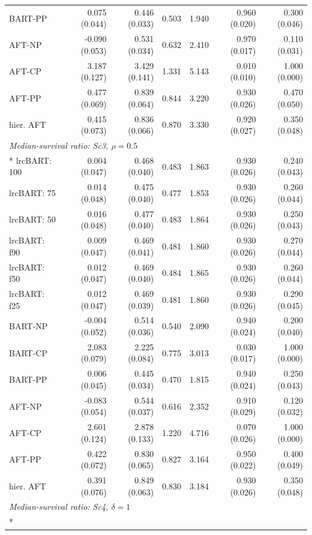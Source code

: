 \begin{landscape}
\begin{longtable}{lrrrrrr}
BART-PP & 0.075 (0.044) & 0.446 (0.033) & 0.503 & 1.940 & 0.960 (0.020) & 0.300 (0.046) \\
AFT-NP & -0.090 (0.053) & 0.531 (0.034) & 0.632 & 2.410 & 0.970 (0.017) & 0.110 (0.031) \\
AFT-CP & 3.187 (0.127) & 3.429 (0.141) & 1.331 & 5.143 & 0.010 (0.010) & 1.000 (0.000) \\
AFT-PP & 0.477 (0.069) & 0.839 (0.064) & 0.844 & 3.220 & 0.930 (0.026) & 0.470 (0.050) \\
hier. AFT & 0.415 (0.073) & 0.836 (0.066) & 0.870 & 3.330 & 0.920 (0.027) & 0.350 (0.048) \\
\multicolumn{7}{l}{\strut\textit{Median-survival ratio: Sc3, $\rho=0.5$}}\\*
lrcBART: 100 & 0.004 (0.047) & 0.468 (0.040) & 0.483 & 1.863 & 0.930 (0.026) & 0.240 (0.043) \\
lrcBART: 75 & 0.014 (0.048) & 0.475 (0.040) & 0.477 & 1.853 & 0.930 (0.026) & 0.260 (0.044) \\
lrcBART: 50 & 0.016 (0.048) & 0.477 (0.040) & 0.483 & 1.864 & 0.930 (0.026) & 0.250 (0.043) \\
lrcBART: f90 & 0.009 (0.047) & 0.469 (0.041) & 0.481 & 1.860 & 0.930 (0.026) & 0.270 (0.044) \\
lrcBART: f50 & 0.012 (0.047) & 0.469 (0.040) & 0.484 & 1.865 & 0.930 (0.026) & 0.260 (0.044) \\
lrcBART: f25 & 0.012 (0.047) & 0.469 (0.039) & 0.481 & 1.860 & 0.930 (0.026) & 0.290 (0.045) \\
BART-NP & -0.004 (0.052) & 0.514 (0.036) & 0.540 & 2.090 & 0.940 (0.024) & 0.200 (0.040) \\
BART-CP & 2.083 (0.079) & 2.225 (0.084) & 0.775 & 3.013 & 0.030 (0.017) & 1.000 (0.000) \\
BART-PP & 0.006 (0.045) & 0.445 (0.034) & 0.470 & 1.815 & 0.940 (0.024) & 0.250 (0.043) \\
AFT-NP & -0.083 (0.054) & 0.544 (0.037) & 0.616 & 2.352 & 0.910 (0.029) & 0.120 (0.032) \\
AFT-CP & 2.601 (0.124) & 2.878 (0.133) & 1.220 & 4.716 & 0.070 (0.026) & 1.000 (0.000) \\
AFT-PP & 0.422 (0.072) & 0.830 (0.065) & 0.827 & 3.164 & 0.950 (0.022) & 0.400 (0.049) \\
hier. AFT & 0.391 (0.076) & 0.849 (0.063) & 0.830 & 3.184 & 0.930 (0.026) & 0.350 (0.048) \\
\multicolumn{7}{l}{\strut\textit{Median-survival ratio: Sc4, $\delta=1$}}\\*

\end{longtable}
\end{landscape}
